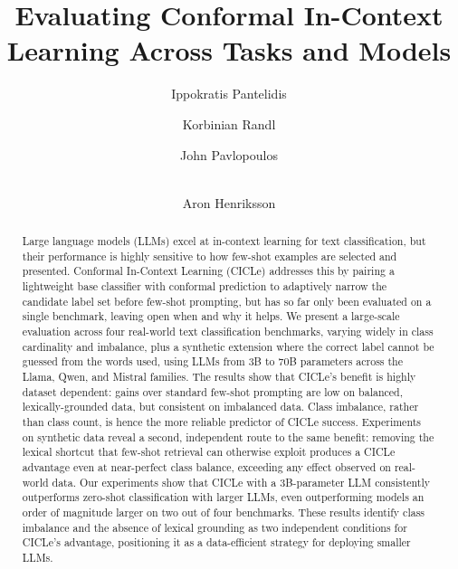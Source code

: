 \documentclass[runningheads]{llncs}
\begin{document}
%
\title{Evaluating Conformal In-Context Learning Across Tasks and Models}
%
%
\author{Ippokratis Pantelidis \and
Korbinian Randl \and
John Pavlopoulos \and \\
Aron Henriksson}
%
%
\maketitle              %
%
\begin{abstract}
Large language models (LLMs) excel at in-context learning for text
classification, but their performance is highly sensitive to how
few-shot examples are selected and presented. Conformal In-Context
Learning (CICLe) addresses this by pairing a lightweight base classifier with conformal prediction to adaptively narrow the candidate label set before few-shot prompting, but has so far only been evaluated on a single benchmark, leaving open when and why it helps. We present a large-scale evaluation across four real-world text classification benchmarks, varying widely in class cardinality and
imbalance, plus a synthetic extension where the correct label cannot be
guessed from the words used, using LLMs from 3B to 70B parameters across
the Llama, Qwen, and Mistral families. The results show that CICLe's benefit is highly dataset dependent: gains over standard few-shot prompting are low on balanced, lexically-grounded data, but consistent on imbalanced data. Class imbalance, rather than class count, is hence the more reliable predictor of CICLe success. Experiments on synthetic data reveal a second, independent route to the same benefit: removing the lexical shortcut that few-shot retrieval can otherwise exploit produces a CICLe advantage even at near-perfect class balance, exceeding any effect observed on real-world data. Our experiments show that CICLe with a 3B-parameter LLM consistently outperforms zero-shot classification with larger LLMs, even outperforming models  an order of magnitude larger on two out of four benchmarks. These results identify class imbalance and the absence of lexical grounding as two independent conditions for CICLe's advantage, positioning it as a data-efficient strategy for deploying smaller LLMs.

\end{abstract}
%
%
\end{document}
